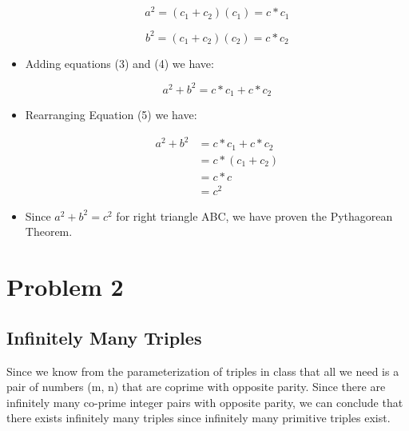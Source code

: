 \documentclass[]{report}
\begin{document}
\begin{itemize}
\begin{center}
						\begin{equation}
							a^{2}= ( c_{1} + c_{2}) (c_1) =  c * c_1
						\end{equation}  
						
						\begin{equation}
							b^{2}= ( c_{1} + c_{2}) (c_2) = c * c_2
						\end{equation}
						
					\end{center}
					
	\item Adding equations (3) and (4) we have:
					\begin{center}
	
						\begin{equation}
							a^{2} + b^{2}= c * c_1 + c * c_2 
						\end{equation}  
						
						
					\end{center}				
					
					
					
	\item Rearranging Equation (5) we have:
				\begin{center}
					\begin{align*}
						a^{2} + b^{2} &= c * c_{1} + c * c_{2}  \\
												   &= c *(c_1 + c_2 ) \\
												   &=  c * c \\ 
												   &= c^{2}
					\end{align*}
					
					
				\end{center}
	\item Since $ 	a^{2} + b^{2} = c^{2}$ for right triangle ABC, we have proven the Pythagorean Theorem.
\end{itemize}


\section{Problem 2}

\subsection{Infinitely Many Triples}


Since we know from the parameterization of triples in class that all we need is a pair of numbers (m, n)  that are coprime with opposite parity.  Since there are infinitely many co-prime integer pairs with opposite parity, we can conclude that there exists infinitely many triples since infinitely many primitive triples exist.
\end{document}
